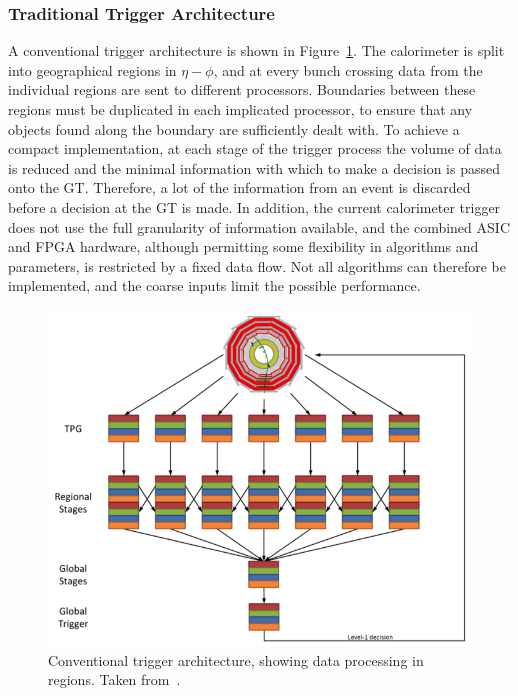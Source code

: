 \subsubsection{Traditional Trigger Architecture}
A conventional trigger architecture is shown in Figure~\ref{fig:tradTrig}.
The calorimeter is split into geographical regions in $\eta-\phi$, 
and at every bunch crossing data from the individual regions are sent to different processors.
Boundaries between these regions must be duplicated in each implicated processor, to ensure that any objects found along the boundary are sufficiently dealt with.
To achieve a compact implementation, at each stage of the trigger process the volume of data is reduced and the minimal information with which to make a decision is passed onto the \ac{GT}. 
Therefore, a lot of the information from an event is discarded before a decision at the \ac{GT} is made.
In addition, the current calorimeter trigger does not use the full granularity of information available, and the combined \ac{ASIC} and \ac{FPGA} hardware, although permitting some flexibility in algorithms and parameters, is restricted by a fixed data flow. 
Not all algorithms can therefore be implemented, and the coarse inputs limit the possible performance.

\begin{figure}[h!]
\begin{center}
  \includegraphics[scale=0.78]{Figures/l1jets/TraditionalTrigger.png}
\caption{Conventional trigger architecture, showing data processing in regions. Taken from~\cite{RoseTrig}.}
\label{fig:tradTrig}
\end{center}
\end{figure}

